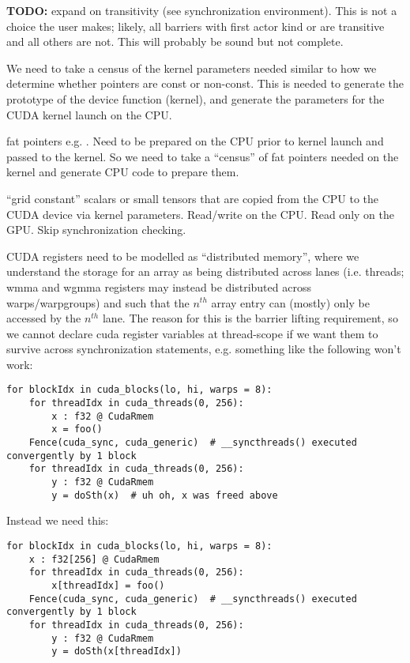 \filbreak
\textbf{TODO:} expand on transitivity (see synchronization environment).
This is not a choice the user makes; likely, all barriers with first actor kind  or  are transitive and all others are not.
This will probably be sound but not complete.

\filbreak
{} We need to take a census of the kernel parameters needed similar to how we determine whether pointers are const or non-const.
This is needed to generate the prototype of the device function (kernel), and generate the parameters for the CUDA kernel launch on the CPU.

\filbreak
{} fat pointers e.g. .
Need to be prepared on the CPU prior to kernel launch and passed to the kernel.
So we need to take a ``census'' of fat pointers needed on the kernel and generate CPU code to prepare them.

\filbreak
{} ``grid constant'' scalars or small tensors that are copied from the CPU to the CUDA device via kernel parameters.
Read/write on the CPU. Read only on the GPU. Skip synchronization checking.

\filbreak
{} CUDA registers need to be modelled as ``distributed memory'', where we understand the storage for an array as being distributed across lanes (i.e. threads; wmma and wgmma registers may instead be distributed across warps/warpgroups) and such that the $n^{th}$ array entry can (mostly) only be accessed by the $n^{th}$ lane.
The reason for this is the barrier lifting requirement, so we cannot declare cuda register variables at thread-scope if we want them to survive across synchronization statements, e.g. something like the following won't work:

\filbreak
{\color{lightttColor}
\begin{verbatim}
for blockIdx in cuda_blocks(lo, hi, warps = 8):
    for threadIdx in cuda_threads(0, 256):
        x : f32 @ CudaRmem
        x = foo()
    Fence(cuda_sync, cuda_generic)  # __syncthreads() executed convergently by 1 block
    for threadIdx in cuda_threads(0, 256):
        y : f32 @ CudaRmem
        y = doSth(x)  # uh oh, x was freed above
\end{verbatim}
}

\filbreak
Instead we need this:
{\color{lightttColor}
\begin{verbatim}
for blockIdx in cuda_blocks(lo, hi, warps = 8):
    x : f32[256] @ CudaRmem
    for threadIdx in cuda_threads(0, 256):
        x[threadIdx] = foo()
    Fence(cuda_sync, cuda_generic)  # __syncthreads() executed convergently by 1 block
    for threadIdx in cuda_threads(0, 256):
        y : f32 @ CudaRmem
        y = doSth(x[threadIdx])
\end{verbatim}
}

